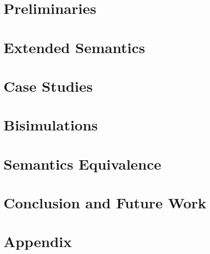 \documentclass[12pt]{article}
\begin{document}
\section{Preliminaries}

\newpage


\section{Extended Semantics}

\newpage


\section{Case Studies}

\newpage


\section{Bisimulations}

\newpage


\section{Semantics Equivalence}

\newpage


\section{Conclusion and Future Work}

\newpage


\section{Appendix}

\newpage




\end{document}
